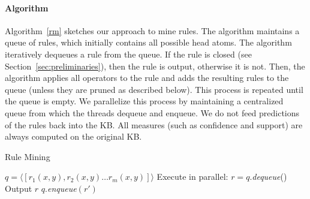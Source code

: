 \paragraph{Algorithm} \label{algo}
Algorithm~\ref{rm} sketches our approach to mine rules. The algorithm maintains a queue of rules, which initially contains all possible head atoms.
The algorithm iteratively dequeues a rule from the queue. If the rule is closed (see Section~\ref{sec:preliminaries}),
then the rule is output, otherwise it is not.
Then, the algorithm applies all operators to the rule and adds the resulting rules to the queue (unless they are pruned as described below).
This process is repeated until the queue is empty. We parallelize this process by maintaining a centralized queue from which the threads dequeue and enqueue.
We do not feed predictions of the rules back into the KB. All measures (such as confidence and support) are always computed on the original KB.



\begin{algorithm}
\caption{Rule Mining}
\label{rm}
\begin{algorithmic}[1]
    \State $q = \langle [r_1(x,y), r_2(x,y) \dots r_m(x,y)] \rangle$
	\State Execute in parallel:
	  \State $r = q.$\emph{dequeue}()
	    \State Output $r$
	  \EndIf
		    \State $q.$\emph{enqueue}$(r')$
		  \EndIf
		\EndFor
      \EndFor
	\EndWhile
\EndFunction
\end{algorithmic}
\end{algorithm}

